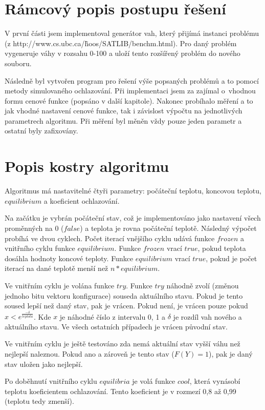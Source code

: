 \documentclass[10pt,a4paper]{article}
\begin{document}
\section{Rámcový popis postupu řešení}
V první části jsem implementoval generátor vah, který přijímá instanci problému  (z http://www.cs.ubc.ca/\~hoos/SATLIB/benchm.html). Pro daný problém vygeneruje váhy v rozsahu 0-100 a uloží tento rozšířený problém do nového souboru.

Následně byl vytvořen program pro řešení výše popsaných problémů a to pomocí metody simulovaného ochlazování. Při implementaci jsem za zajímal o~vhodnou formu cenové funkce (popsáno v další kapitole). Nakonec probíhalo měření a to jak vhodné nastavení cenové funkce, tak i závislost výpočtu na jednotlivých parametrech algoritmu. Při měření byl měněn vždy pouze jeden parametr a ostatní byly zafixovány.

\section{Popis kostry algoritmu}
Algoritmus má nastavitelné čtyři parametry: počáteční teplotu, koncovou teplotu, $equilibrium$ a koeficient ochlazování.

Na začátku je vybrán počáteční stav, což je implementováno jako nastavení všech proměnných na 0 ($false$) a teplota je rovna počáteční teplotě. Následný výpočet probíhá ve dvou cyklech. Počet iterací vnějšího cyklu udává funkce $frozen$ a vnitřního cyklu funkce $equilibrium$. Funkce $frozen$ vrací $true$, pokud teplota dosáhla hodnoty koncové teploty. Funkce $equilibrium$ vrací $true$, pokud je počet iterací na dané teplotě menší než $n * equilibrium$.

Ve vnitřním cyklu je volána funkce $try$. Funkce $try$ náhodně zvolí (změnou jednoho bitu vektoru konfigurace) souseda aktuálního stavu. Pokud je tento soused lepší než daný stav, pak je vrácen. Pokud není, je vrácen pouze pokud $ x < e^{\frac{-\delta}{teplota}}$. Kde $x$ je náhodné číslo z intervalu 0, 1 a $\delta$ je rozdíl vah nového a aktuálního stavu. Ve všech ostatních případech je vrácen původní stav.

Ve vnitřním cyklu je ještě testováno zda nemá aktuální stav vyšší váhu než nejlepší naleznou. Pokud ano a zároveň je tento stav  ($F(Y)=1$), pak je daný stav uložen jako nejlepší.

Po doběhnutí vnitřního cyklu $equilibria$ je volá funkce $cool$, která vynásobí teplotu koeficientem ochlazování. Tento koeficient je v rozmezí 0,8 až 0,99 (teplotu tedy zmenší).
\end{document}
